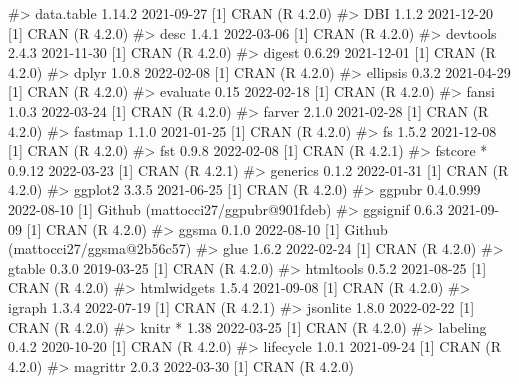 \documentclass[
  11pt,
  letterpaper,
  DIV=11,
  numbers=noendperiod]{scrartcl}
\newenvironment{Shaded}{}{}
\newcommand{\CommentTok}[1]{\textcolor[rgb]{0.42,0.45,0.49}{#1}}
\begin{document}
\begin{Shaded}
\begin{Highlighting}[]
\CommentTok{\#\textgreater{}  data.table    1.14.2    2021{-}09{-}27 [1] CRAN (R 4.2.0)}
\CommentTok{\#\textgreater{}  DBI           1.1.2     2021{-}12{-}20 [1] CRAN (R 4.2.0)}
\CommentTok{\#\textgreater{}  desc          1.4.1     2022{-}03{-}06 [1] CRAN (R 4.2.0)}
\CommentTok{\#\textgreater{}  devtools      2.4.3     2021{-}11{-}30 [1] CRAN (R 4.2.0)}
\CommentTok{\#\textgreater{}  digest        0.6.29    2021{-}12{-}01 [1] CRAN (R 4.2.0)}
\CommentTok{\#\textgreater{}  dplyr         1.0.8     2022{-}02{-}08 [1] CRAN (R 4.2.0)}
\CommentTok{\#\textgreater{}  ellipsis      0.3.2     2021{-}04{-}29 [1] CRAN (R 4.2.0)}
\CommentTok{\#\textgreater{}  evaluate      0.15      2022{-}02{-}18 [1] CRAN (R 4.2.0)}
\CommentTok{\#\textgreater{}  fansi         1.0.3     2022{-}03{-}24 [1] CRAN (R 4.2.0)}
\CommentTok{\#\textgreater{}  farver        2.1.0     2021{-}02{-}28 [1] CRAN (R 4.2.0)}
\CommentTok{\#\textgreater{}  fastmap       1.1.0     2021{-}01{-}25 [1] CRAN (R 4.2.0)}
\CommentTok{\#\textgreater{}  fs            1.5.2     2021{-}12{-}08 [1] CRAN (R 4.2.0)}
\CommentTok{\#\textgreater{}  fst           0.9.8     2022{-}02{-}08 [1] CRAN (R 4.2.1)}
\CommentTok{\#\textgreater{}  fstcore     * 0.9.12    2022{-}03{-}23 [1] CRAN (R 4.2.1)}
\CommentTok{\#\textgreater{}  generics      0.1.2     2022{-}01{-}31 [1] CRAN (R 4.2.0)}
\CommentTok{\#\textgreater{}  ggplot2       3.3.5     2021{-}06{-}25 [1] CRAN (R 4.2.0)}
\CommentTok{\#\textgreater{}  ggpubr        0.4.0.999 2022{-}08{-}10 [1] Github (mattocci27/ggpubr@901fdeb)}
\CommentTok{\#\textgreater{}  ggsignif      0.6.3     2021{-}09{-}09 [1] CRAN (R 4.2.0)}
\CommentTok{\#\textgreater{}  ggsma         0.1.0     2022{-}08{-}10 [1] Github (mattocci27/ggsma@2b56c57)}
\CommentTok{\#\textgreater{}  glue          1.6.2     2022{-}02{-}24 [1] CRAN (R 4.2.0)}
\CommentTok{\#\textgreater{}  gtable        0.3.0     2019{-}03{-}25 [1] CRAN (R 4.2.0)}
\CommentTok{\#\textgreater{}  htmltools     0.5.2     2021{-}08{-}25 [1] CRAN (R 4.2.0)}
\CommentTok{\#\textgreater{}  htmlwidgets   1.5.4     2021{-}09{-}08 [1] CRAN (R 4.2.0)}
\CommentTok{\#\textgreater{}  igraph        1.3.4     2022{-}07{-}19 [1] CRAN (R 4.2.1)}
\CommentTok{\#\textgreater{}  jsonlite      1.8.0     2022{-}02{-}22 [1] CRAN (R 4.2.0)}
\CommentTok{\#\textgreater{}  knitr       * 1.38      2022{-}03{-}25 [1] CRAN (R 4.2.0)}
\CommentTok{\#\textgreater{}  labeling      0.4.2     2020{-}10{-}20 [1] CRAN (R 4.2.0)}
\CommentTok{\#\textgreater{}  lifecycle     1.0.1     2021{-}09{-}24 [1] CRAN (R 4.2.0)}
\CommentTok{\#\textgreater{}  magrittr      2.0.3     2022{-}03{-}30 [1] CRAN (R 4.2.0)}

\end{Highlighting}
\end{Shaded}
\end{document}
